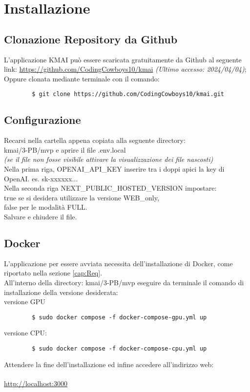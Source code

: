 \chapter{Installazione} \label{cap:Inst}
\section{Clonazione Repository da Github}
L'applicazione KMAI può essere scaricata gratuitamente da Github al seguente link: \url{https://github.com/CodingCowboys10/kmai} \textit{(Ultimo accesso: 2024/04/04)}; \\
Oppure clonata mediante terminale con il comando:
    \begin{lstlisting}
        $ git clone https://github.com/CodingCowboys10/kmai.git
    \end{lstlisting}

\section{Configurazione}
Recarsi nella cartella appena copiata alla seguente directory: \\
kmai/3-PB/mvp e aprire il file .env.local\\ \textit{(se il file non fosse visibile attivare la visualizzazione dei file nascosti)}\\
Nella prima riga, OPENAI\_API\_KEY inserire tra i doppi apici la key di OpenAI. es. sk-xxxxxx...\\
Nella seconda riga NEXT\_PUBLIC\_HOSTED\_VERSION impostare:\\ true se si desidera utilizzare la versione WEB\_only,\\ false per le modalità FULL.\\
Salvare e chiudere il file.

\section{Docker}
L'applicazione per essere avviata necessita dell'installazione di Docker, come riportato nella sezione \ref{cap:Req}.\\
All'interno della directory: kmai/3-PB/mvp eseguire da terminale il comando di installazione della versione desiderata: \\
versione GPU
    \begin{lstlisting}
        $ sudo docker compose -f docker-compose-gpu.yml up
    \end{lstlisting}
versione CPU:
    \begin{lstlisting}
        $ sudo docker compose -f docker-compose-cpu.yml up
    \end{lstlisting}
Attendere la fine dell'installazione ed infine accedere all'indirizzo web: \\\\
\url{http://localhost:3000}
